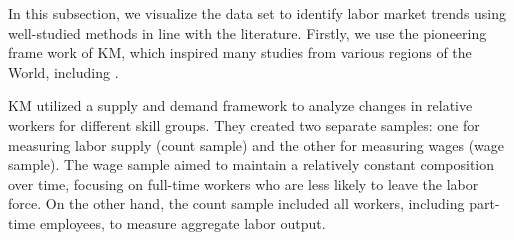 \begin{onehalfspace}
In this subsection, we visualize the data set to identify labor market
trends using well-studied methods in line with the literature. Firstly,
we use the pioneering frame work of KM, which inspired many studies
from various regions of the World, including \citet{2015Bakis,RePEc:erg:wpaper:1509}.

KM utilized a supply and demand framework to analyze changes in relative
workers for different skill groups. They created two separate samples:
one for measuring labor supply (count sample) and the other for measuring
wages (wage sample). The wage sample aimed to maintain a relatively
constant composition over time, focusing on full-time workers who
are less likely to leave the labor force. On the other hand, the count
sample included all workers, including part-time employees, to measure
aggregate labor output.
\end{onehalfspace}

